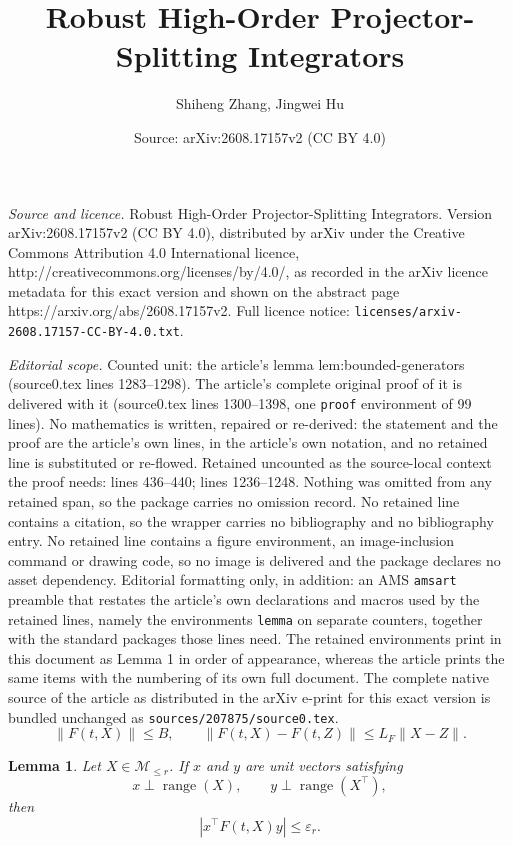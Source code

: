 \documentclass[10pt,a4paper]{amsart}
\title{Robust High-Order Projector-Splitting Integrators}
\author{Shiheng Zhang, Jingwei Hu}
\date{Source: arXiv:2608.17157v2 (CC BY 4.0)}
\newtheorem{lemma}{Lemma}
\newcommand{\Mle}{\mathcal{M}_{\le r}}
\newcommand{\eps}{\varepsilon}
\newcommand{\range}{\operatorname{range}}
\begin{document}
\maketitle

\noindent\emph{Source and licence.} Robust High-Order Projector-Splitting Integrators. Version arXiv:2608.17157v2 (CC BY 4.0), distributed by arXiv under the Creative Commons Attribution 4.0 International licence, http://creativecommons.org/licenses/by/4.0/, as recorded in the arXiv licence metadata for this exact version and shown on the abstract page https://arxiv.org/abs/2608.17157v2. Full licence notice: \texttt{licenses/arxiv-2608.17157-CC-BY-4.0.txt}.\par\smallskip

\noindent\textit{Editorial scope.} Counted unit: the article's lemma lem:bounded-generators (source0.tex lines 1283--1298). The article's complete original proof of it is delivered with it (source0.tex lines 1300--1398, one \texttt{proof} environment of 99 lines). No mathematics is written, repaired or re-derived: the statement and the proof are the article's own lines, in the article's own notation, and no retained line is substituted or re-flowed.  Retained uncounted as the source-local context the proof needs: lines 436--440; lines 1236--1248.  Nothing was omitted from any retained span, so the package carries no omission record.  No retained line contains a citation, so the wrapper carries no bibliography and no bibliography entry.  No retained line contains a figure environment, an image-inclusion command or drawing code, so no image is delivered and the package declares no asset dependency.  Editorial formatting only, in addition: an AMS \texttt{amsart} preamble that restates the article's own declarations and macros used by the retained lines, namely the environments \texttt{lemma} on separate counters, together with the standard packages those lines need.  The retained environments print in this document as Lemma 1 in order of appearance, whereas the article prints the same items with the numbering of its own full document.  The complete native source of the article as distributed in the arXiv e-print for this exact version is bundled unchanged as \texttt{sources/207875/source0.tex}.
\begin{equation}\label{eq:assumption-BL}
 \|F(t,X)\|\le B,
 \qquad
 \|F(t,X)-F(t,Z)\|\le L_F\|X-Z\|.
\end{equation}

\begin{lemma}
\label{lem:lower-stratum-defect}
Let \(X\in\Mle\).  If \(x\) and \(y\) are unit vectors satisfying
\begin{equation}\label{eq:lower-normal-directions}
 x\perp\range(X),
 \qquad
 y\perp\range(X^\top),
\end{equation}
then
\begin{equation}\label{eq:lower-stratum-defect}
 |x^\top F(t,X)y|\le\eps_r.
\end{equation}
\end{lemma}
\end{document}
